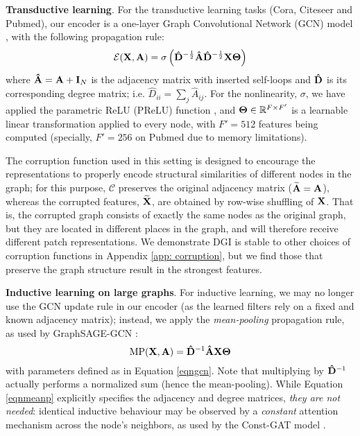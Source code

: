 \documentclass{article} \usepackage{iclr2019_conference,times}
\newcommand{\xhdr}[1]{{\noindent\bfseries #1}.}
\begin{document}
\xhdr{Transductive learning} 
For the transductive learning tasks (Cora, Citeseer and Pubmed), our encoder is a one-layer Graph Convolutional Network (GCN) model \citep{kipf2016semi}, with the following propagation rule:
\begin{equation}
\label{eqngcn}
	\mathcal{E}({\bf X}, {\bf A}) = \sigma\left({\bf \hat{D}}^{-\frac{1}{2}}{\bf \hat{A}}{\bf \hat{D}}^{-\frac{1}{2}}{\bf X}{\bf \Theta}\right)
\end{equation}
where ${\bf \hat{A}} = {\bf A} + {\bf I}_N$ is the adjacency matrix with inserted self-loops and $\bf \hat{D}$ is its corresponding degree matrix; i.e. $\hat{D}_{ii} = \sum_j \hat{A}_{ij}$. For the nonlinearity, $\sigma$, we have applied the parametric ReLU (PReLU) function \citep{he2015delving}, and ${\bf \Theta} \in \mathbb{R}^{F \times F'}$ is a learnable linear transformation applied to every node, with $F' = 512$ features being computed (specially, $F' = 256$ on Pubmed due to memory limitations).

The corruption function used in this setting is designed to encourage the representations to properly encode structural similarities of different nodes in the graph; for this purpose, $\mathcal{C}$ preserves the original adjacency matrix (${\bf \widetilde{A}} = {\bf A}$), whereas the corrupted features, $\bf \widetilde{X}$, are obtained by row-wise shuffling of ${\bf X}$. That is, the corrupted graph consists of exactly the same nodes as the original graph, but they are located in different places in the graph, and will therefore receive different patch representations.  We demonstrate DGI is stable to other choices of corruption functions in Appendix \ref{app: corruption}, but we find those that preserve the graph structure result in the strongest features.

\xhdr{Inductive learning on large graphs}
For inductive learning, we may no longer use the GCN update rule in our encoder (as the learned filters rely on a fixed and known adjacency matrix); instead, we apply the \emph{mean-pooling} propagation rule, as used by GraphSAGE-GCN \citep{hamilton2017inductive}:
\begin{equation}
\label{eqnmeanp}
	\text{MP}({\bf X}, {\bf A}) = {\bf \hat{D}}^{-1}{\bf \hat{A}}{\bf X}{\bf \Theta}
\end{equation} 
with parameters defined as in Equation \ref{eqngcn}. Note that multiplying by ${\bf \hat{D}}^{-1}$ actually performs a normalized sum (hence the mean-pooling). While Equation \ref{eqnmeanp} explicitly specifies the adjacency and degree matrices, \emph{they are not needed}: identical inductive behaviour may be observed by a \emph{constant} attention mechanism across the node's neighbors, as used by the Const-GAT model \citep{velickovic2018graph}.
\end{document}
